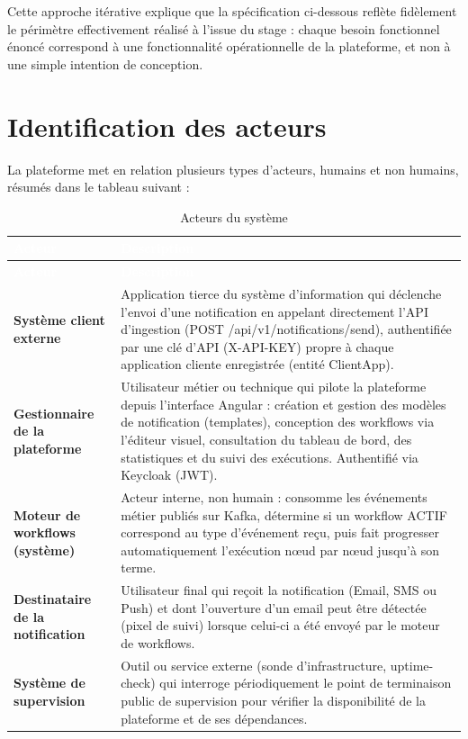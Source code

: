 \documentclass[12pt,a4paper]{report}
\begin{document}
Cette approche itérative explique que la spécification ci-dessous reflète fidèlement le périmètre effectivement réalisé à l'issue du stage : chaque besoin fonctionnel énoncé correspond à une fonctionnalité opérationnelle de la plateforme, et non à une simple intention de conception.

\section{Identification des acteurs}

La plateforme met en relation plusieurs types d'acteurs, humains et non humains, résumés dans le tableau suivant :

\begin{longtable}{@{}>{\raggedright\arraybackslash}p{}p{}@{}}
\caption{Acteurs du système}\\
\hline
\rowcolor{darkblue}\textcolor{white}{\textbf{Acteur}} & \textcolor{white}{\textbf{Description}} \\
\hline
\endfirsthead
\hline
\rowcolor{darkblue}\textcolor{white}{\textbf{Acteur}} & \textcolor{white}{\textbf{Description}} \\
\hline
\endhead
\hline
\endfoot
\textbf{Système client externe} & Application tierce du système d'information qui déclenche l'envoi d'une notification en appelant directement l'API d'ingestion (POST /api/v1/notifications/send), authentifiée par une clé d'API (X-API-KEY) propre à chaque application cliente enregistrée (entité ClientApp). \\
\hline
\textbf{Gestionnaire de la plateforme} & Utilisateur métier ou technique qui pilote la plateforme depuis l'interface Angular : création et gestion des modèles de notification (templates), conception des workflows via l'éditeur visuel, consultation du tableau de bord, des statistiques et du suivi des exécutions. Authentifié via Keycloak (JWT). \\
\hline
\textbf{Moteur de workflows (système)} & Acteur interne, non humain : consomme les événements métier publiés sur Kafka, détermine si un workflow ACTIF correspond au type d'événement reçu, puis fait progresser automatiquement l'exécution n\oe ud par n\oe ud jusqu'à son terme. \\
\hline
\textbf{Destinataire de la notification} & Utilisateur final qui reçoit la notification (Email, SMS ou Push) et dont l'ouverture d'un email peut être détectée (pixel de suivi) lorsque celui-ci a été envoyé par le moteur de workflows. \\
\hline
\textbf{Système de supervision} & Outil ou service externe (sonde d'infrastructure, uptime-check) qui interroge périodiquement le point de terminaison public de supervision pour vérifier la disponibilité de la plateforme et de ses dépendances. \\
\hline
\end{longtable}
\end{document}
